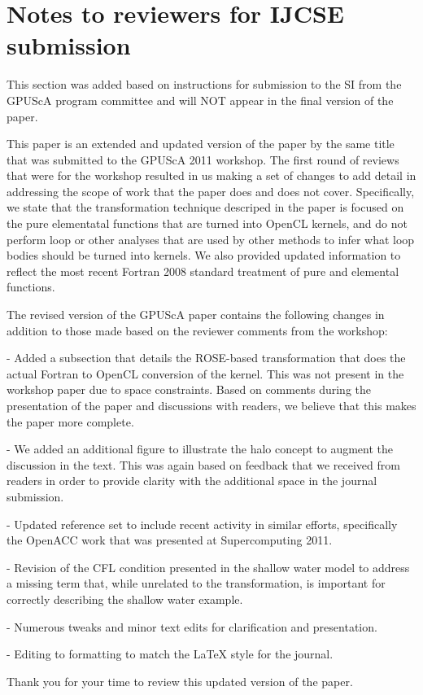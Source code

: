 \section{Notes to reviewers for IJCSE submission}

This section was added based on instructions for submission to the SI from
the GPUScA program committee and will NOT appear in the final version of the
paper.

This paper is an extended and updated version of the paper by the same title
that was submitted to the GPUScA 2011 workshop.  The first round of reviews
that were for the workshop resulted in us making a set of changes to add
detail in addressing the scope of work that the paper does and does not
cover.  Specifically, we state that the transformation technique descriped
in the paper is focused on the pure elementatal functions that are
turned into OpenCL kernels, and do not perform loop or other analyses that
are used by other methods to infer what loop bodies should be turned into
kernels.  We also provided updated information to reflect the most
recent Fortran 2008 standard treatment of pure and elemental functions.

The revised version of the GPUScA paper contains the following changes in
addition to those made based on the reviewer comments from the workshop:

- Added a subsection that details the ROSE-based transformation that does
  the actual Fortran to OpenCL conversion of the kernel.  This was not
  present in the workshop paper due to space constraints.  Based on
  comments during the presentation of the paper and discussions with
  readers, we believe that this makes the paper more complete.

- We added an additional figure to illustrate the halo concept to augment
  the discussion in the text.  This was again based on feedback that we
  received from readers in order to provide clarity with the additional
  space in the journal submission.

- Updated reference set to include recent activity in similar efforts,
  specifically the OpenACC work that was presented at Supercomputing 2011.

- Revision of the CFL condition presented in the shallow water model
  to address a missing term that, while unrelated to the transformation,
  is important for correctly describing the shallow water example.

- Numerous tweaks and minor text edits for clarification and presentation.

- Editing to formatting to match the LaTeX style for the journal.



Thank you for your time to review this updated version of the paper.


